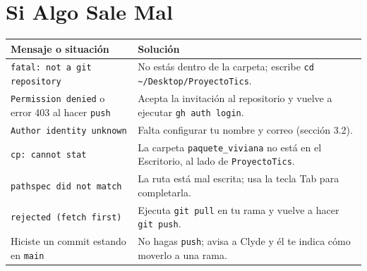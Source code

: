 \documentclass[11pt,a4paper]{article}
\begin{document}
\section{Si Algo Sale Mal}
{\small
{}
\noindent\begin{tabularx}{\textwidth}{@{}P{5.2cm} L@{}}
\toprule
{}
\textbf{Mensaje o situación} & \textbf{Solución} \\
\midrule
\texttt{fatal: not a git repository} & No estás dentro de la carpeta; escribe \nolinkurl{cd ~/Desktop/ProyectoTics}. \\
\texttt{Permission denied} o error 403 al hacer \texttt{push} & Acepta la invitación al repositorio y vuelve a ejecutar \texttt{gh auth login}. \\
\texttt{Author identity unknown} & Falta configurar tu nombre y correo (sección 3.2). \\
\texttt{cp: cannot stat} & La carpeta \texttt{paquete\_viviana} no está en el Escritorio, al lado de \texttt{ProyectoTics}. \\
\texttt{pathspec did not match} & La ruta está mal escrita; usa la tecla Tab para completarla. \\
\texttt{rejected (fetch first)} & Ejecuta \texttt{git pull} en tu rama y vuelve a hacer \texttt{git push}. \\
Hiciste un commit estando en \texttt{main} & No hagas \texttt{push}; avisa a Clyde y él te indica cómo moverlo a una rama. \\
\bottomrule
\end{tabularx}
}
\end{document}
